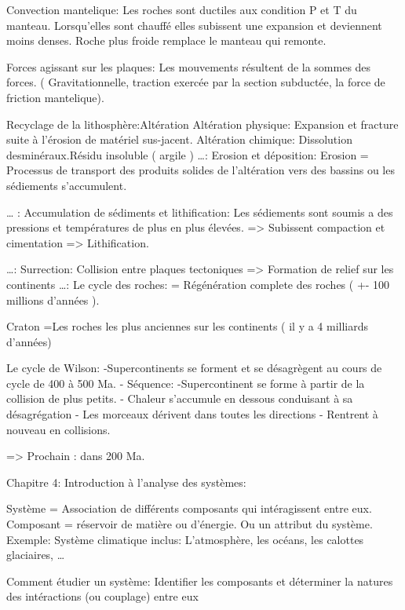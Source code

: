 Convection mantelique:
Les roches sont ductiles aux condition P et T du manteau.
Lorsqu’elles sont chauffé elles subissent une expansion et deviennent moins denses.
Roche plus froide remplace le manteau qui remonte.


Forces agissant sur les plaques:
Les mouvements résultent de la sommes des forces. ( Gravitationnelle, traction exercée par la section subductée, la force de friction mantelique).


Recyclage de la lithosphère:Altération
Altération physique: Expansion et fracture suite à l’érosion de matériel sus-jacent.
Altération chimique: Dissolution desminéraux.Résidu insoluble ( argile )
…: Erosion et déposition:
Erosion = Processus de transport des produits solides de l’altération vers des bassins ou les sédiements s’accumulent.


… : Accumulation de sédiments et lithification:
Les sédiements sont soumis a des pressions et températures de plus en plus élevées.
=> Subissent compaction et cimentation => Lithification.


…: Surrection:
Collision entre plaques tectoniques => Formation de relief sur les continents
…: Le cycle des roches:
= Régénération complete des roches ( +- 100 millions d’années ).




Craton =Les roches les plus anciennes sur les continents ( il y a 4 milliards d’années)




Le cycle de Wilson:
-Supercontinents se forment et se désagrègent au cours de cycle de 400 à 500 Ma.
- Séquence:
        -Supercontinent se forme à partir de la collision de plus petits.
        - Chaleur s’accumule en dessous conduisant à sa désagrégation
        - Les morceaux dérivent dans toutes les directions
        - Rentrent à nouveau en collisions.


=> Prochain : dans 200 Ma.


Chapitre 4: Introduction à l’analyse des systèmes:
  





Système = Association de différents composants qui intéragissent entre eux.
Composant = réservoir de matière ou d’énergie. Ou un attribut du système.
Exemple: Système climatique inclus: L’atmosphère, les océans, les calottes glaciaires, …


Comment étudier un système:
Identifier les composants et déterminer la natures des intéractions (ou couplage) entre eux




